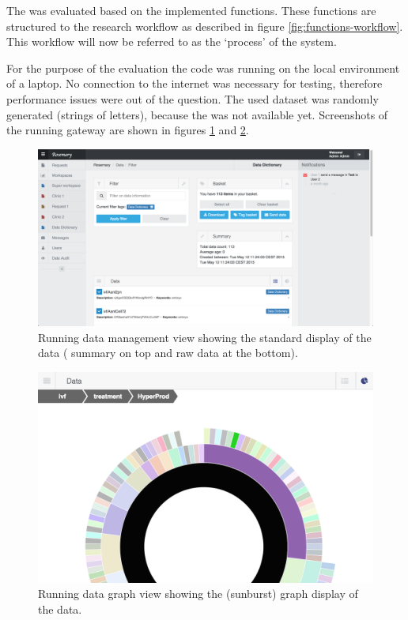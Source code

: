 The \ivfprototype{} was evaluated based on the implemented functions.
These functions are structured to the research workflow as described in figure \ref{fig:functions-workflow}. 
This workflow will now be referred to as the `process' of the system.

For the purpose of the evaluation the \ivfprototype{} code was running on the local environment of a laptop.
No connection to the internet was necessary for testing, therefore performance issues were out of the question.
The used dataset was randomly generated (strings of letters), because the \projectdata{} was not available yet.
Screenshots of the running gateway are shown in figures \ref{fig:standard-view-website} and \ref{fig:sunburst-view-zoom-website}.

\begin{figure}[!b]
	\centering
	\includegraphics[width=1.0\linewidth]{images/standard-view}
	\caption{
		Running \ivfsystem{} data management view showing the standard display of the data (\ie{} summary on top and raw data at the bottom).
	}
	\label{fig:standard-view-website}
\end{figure}

\begin{figure}[ht]
	\centering
	\includegraphics[width=0.7\linewidth]{images/sunburst-closeup}
	\caption{
		Running \ivfsystem{} data graph view showing the (sunburst) graph display of the data.
	}
	\label{fig:sunburst-view-zoom-website}
\end{figure}


